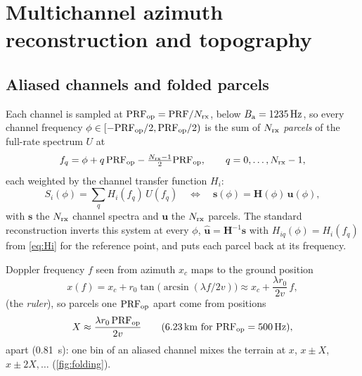 \chapter{Multichannel azimuth reconstruction and topography}\label{ch:recon}

\section{Aliased channels and folded parcels}

Each channel is sampled at $\mathrm{PRF}_{\mathrm{op}}=\mathrm{PRF}/{N_{\mathrm{rx}}}$, below $B_{\mathrm{a}}=\SI{1235}{Hz}$, so every channel frequency
$\phi\in[-\mathrm{PRF}_{\mathrm{op}}/2,\mathrm{PRF}_{\mathrm{op}}/2)$ is the sum of ${N_{\mathrm{rx}}}$ \emph{parcels} of the full-rate spectrum $U$ at
\begin{equation}
  f_q = \phi + q\,\mathrm{PRF}_{\mathrm{op}} - \tfrac{{N_{\mathrm{rx}}}-1}{2}\mathrm{PRF}_{\mathrm{op}}, \qquad q=0,\dots,{N_{\mathrm{rx}}}-1 ,
\end{equation}
each weighted by the channel transfer function $H_i$:
\begin{equation}
  S_i(\phi) = \sum_{q} H_i(f_q)\, U(f_q)
  \quad\Longleftrightarrow\quad
  \bm{s}(\phi) = \mathbf{H}(\phi)\,\bm{u}(\phi),
  \label{eq:fold}
\end{equation}
with $\bm{s}$ the ${N_{\mathrm{rx}}}$ channel spectra and $\bm{u}$ the ${N_{\mathrm{rx}}}$ parcels. The standard reconstruction
\cite{Krieger2004,Gebert2009} inverts this system at every $\phi$, $\hat{\bm u}=\mathbf H^{-1}\bm s$ with
$H_{iq}(\phi)=H_i(f_q)$ from \eqref{eq:Hi} for the reference point, and puts each parcel back at its frequency.

Doppler frequency $f$ seen from azimuth $x_c$ maps to the ground position
\begin{equation}
  x(f) = x_c + r_0 \tan\!\bigl(\arcsin(\lambda f/2v)\bigr) \approx x_c + \frac{\lambda r_0}{2v}\, f ,
  \label{eq:ruler}
\end{equation}
(the \emph{ruler}), so parcels one $\mathrm{PRF}_{\mathrm{op}}$ apart come from positions
\begin{equation}
  X \approx \frac{\lambda r_0\,\mathrm{PRF}_{\mathrm{op}}}{2v} \qquad (\SI{6.23}{km}\text{ for } \mathrm{PRF}_{\mathrm{op}}=\SI{500}{Hz}),
\end{equation}
apart (\SI{0.81}{s}): one bin of an aliased channel mixes the terrain at $x$, $x\pm X$, $x\pm 2X,\dots$
(\cref{fig:folding}).

